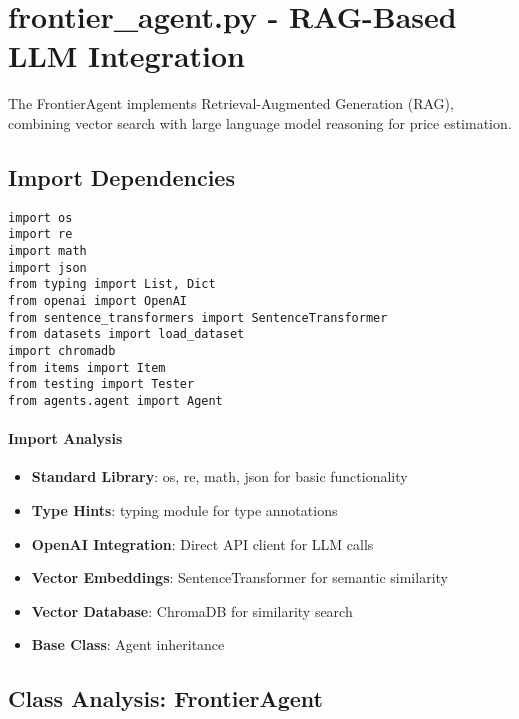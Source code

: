 \section{frontier\_agent.py - RAG-Based LLM Integration}

The FrontierAgent implements Retrieval-Augmented Generation (RAG), combining vector search with large language model reasoning for price estimation.

\subsection{Import Dependencies}

\begin{lstlisting}[caption=frontier\_agent.py - Dependencies]
import os
import re
import math
import json
from typing import List, Dict
from openai import OpenAI
from sentence_transformers import SentenceTransformer
from datasets import load_dataset
import chromadb
from items import Item
from testing import Tester
from agents.agent import Agent
\end{lstlisting}

\paragraph{Import Analysis}
\begin{itemize}
\item \textbf{Standard Library}: os, re, math, json for basic functionality
\item \textbf{Type Hints}: typing module for type annotations
\item \textbf{OpenAI Integration}: Direct API client for LLM calls
\item \textbf{Vector Embeddings}: SentenceTransformer for semantic similarity
\item \textbf{Vector Database}: ChromaDB for similarity search
\item \textbf{Base Class}: Agent inheritance
\end{itemize}

\subsection{Class Analysis: FrontierAgent}

